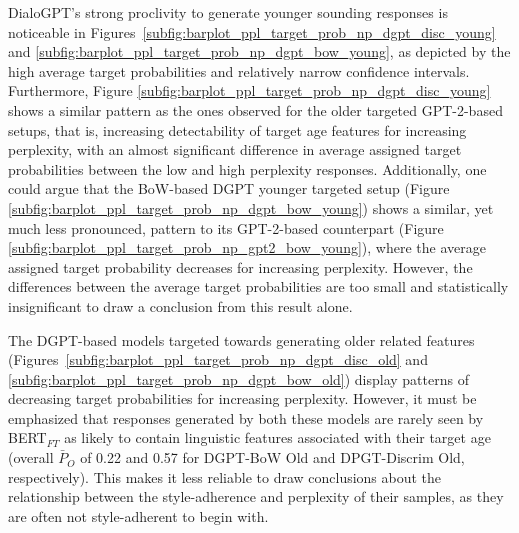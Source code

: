 DialoGPT's strong proclivity to generate younger sounding responses is noticeable in Figures~\ref{subfig:barplot_ppl_target_prob_np_dgpt_disc_young} and \ref{subfig:barplot_ppl_target_prob_np_dgpt_bow_young}, as depicted by the high average target probabilities and relatively narrow confidence intervals. Furthermore, Figure \ref{subfig:barplot_ppl_target_prob_np_dgpt_disc_young} shows a similar pattern as the ones observed for the older targeted GPT-2-based setups, that is, increasing detectability of target age features for increasing perplexity, with an almost significant difference in average assigned target probabilities between the low and high perplexity responses. 
Additionally, one could argue that the BoW-based DGPT younger targeted setup (Figure \ref{subfig:barplot_ppl_target_prob_np_dgpt_bow_young}) shows a similar, yet much less pronounced, pattern to its GPT-2-based counterpart (Figure \ref{subfig:barplot_ppl_target_prob_np_gpt2_bow_young}), where the average assigned target probability decreases for increasing perplexity. However, the differences between the average target probabilities are too small and statistically insignificant to draw a conclusion from this result alone.

The DGPT-based models targeted towards generating older related features (Figures~\ref{subfig:barplot_ppl_target_prob_np_dgpt_disc_old} and \ref{subfig:barplot_ppl_target_prob_np_dgpt_bow_old}) display patterns of decreasing target probabilities for increasing perplexity. However, it must be emphasized that responses generated by both these models are rarely seen by BERT$_{FT}$ as likely to contain linguistic features associated with their target age (overall $\bar{P}_O$ of 0.22 and 0.57 for DGPT-BoW Old and DPGT-Discrim Old, respectively). This makes it less reliable to draw conclusions about the relationship between the style-adherence and perplexity of their samples, as they are often not style-adherent to begin with.



